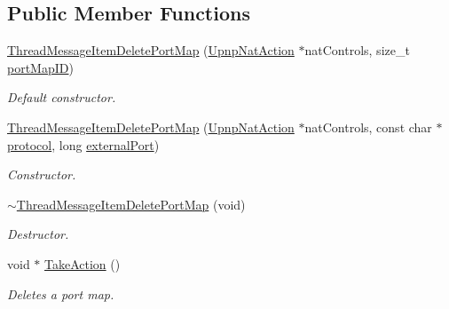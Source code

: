 \subsection*{Public Member Functions}
\begin{DoxyCompactItemize}
\item 
\hyperlink{class_thread_message_item_delete_port_map_af026903a3f9cf33723c94f4de1db074a}{ThreadMessageItemDeletePortMap} (\hyperlink{class_upnp_nat_action}{UpnpNatAction} $\ast$natControls, size\_\-t \hyperlink{class_thread_message_item_delete_port_map_a917b90069309efb7a8344c34348fa9c5}{portMapID})
\begin{DoxyCompactList}\small\item\em Default constructor. \item\end{DoxyCompactList}\item 
\hyperlink{class_thread_message_item_delete_port_map_a7322596746d7e29c78759b7dcd07aa7f}{ThreadMessageItemDeletePortMap} (\hyperlink{class_upnp_nat_action}{UpnpNatAction} $\ast$natControls, const char $\ast$\hyperlink{class_thread_message_item_delete_port_map_a6a5d707645152f8b18458766cb43789a}{protocol}, long \hyperlink{class_thread_message_item_delete_port_map_a6eebc86d208f2ad0553258e3fa510590}{externalPort})
\begin{DoxyCompactList}\small\item\em Constructor. \item\end{DoxyCompactList}\item 
\hypertarget{class_thread_message_item_delete_port_map_aec05b002cb198c0eeb13a5dae0d95392}{
\hyperlink{class_thread_message_item_delete_port_map_aec05b002cb198c0eeb13a5dae0d95392}{$\sim$ThreadMessageItemDeletePortMap} (void)}
\label{class_thread_message_item_delete_port_map_aec05b002cb198c0eeb13a5dae0d95392}

\begin{DoxyCompactList}\small\item\em Destructor. \item\end{DoxyCompactList}\item 
void $\ast$ \hyperlink{class_thread_message_item_delete_port_map_ad1de6d42bb481e4e9c8f22e9cb3aedbc}{TakeAction} ()
\begin{DoxyCompactList}\small\item\em Deletes a port map. \item\end{DoxyCompactList}\end{DoxyCompactItemize}
